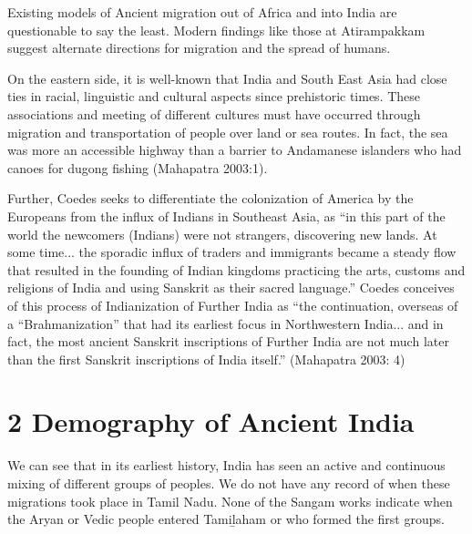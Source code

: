 \vskip 2pt

Existing models of Ancient migration out of Africa and into India are questionable to say the least. Modern findings like those at Atirampakkam suggest alternate directions for migration and the spread of humans.

\vskip 2pt

On the eastern side, it is well-known that India and South East Asia had close ties in racial, linguistic and cultural aspects since prehistoric times. These associations and meeting of different cultures must have occurred through migration and transportation of people over land or sea routes. In fact, the sea was more an accessible highway than a barrier to Andamanese islanders who had canoes for dugong fishing (Mahapatra 2003:1).

\vskip 2pt

\begin{myquote}
Further, Coedes seeks to differentiate the colonization of America by the Europeans from the influx of Indians in Southeast Asia, as “in this part of the world the newcomers (Indians) were not strangers, discovering new lands. At some time... the sporadic influx of traders and immigrants became a steady flow that resulted in the founding of Indian kingdoms practicing the arts, customs and religions of India and using Sanskrit as their sacred language.” Coedes conceives of this process of Indianization of Further India as “the continuation, overseas of a “Brahmanization” that had its earliest focus in Northwestern India... and in fact, the most ancient Sanskrit inscriptions of Further India are not much later than the first Sanskrit inscriptions of India itself.” (Mahapatra 2003: 4)
\end{myquote}


\section*{2 Demography of Ancient India}

We can see that in its earliest history, India has seen an active and continuous mixing of different groups of peoples. We do not have any record of when these migrations took place in Tamil Nadu. None of the Sangam works indicate when the Aryan or Vedic people entered Tamiḻaham or who formed the first groups.

